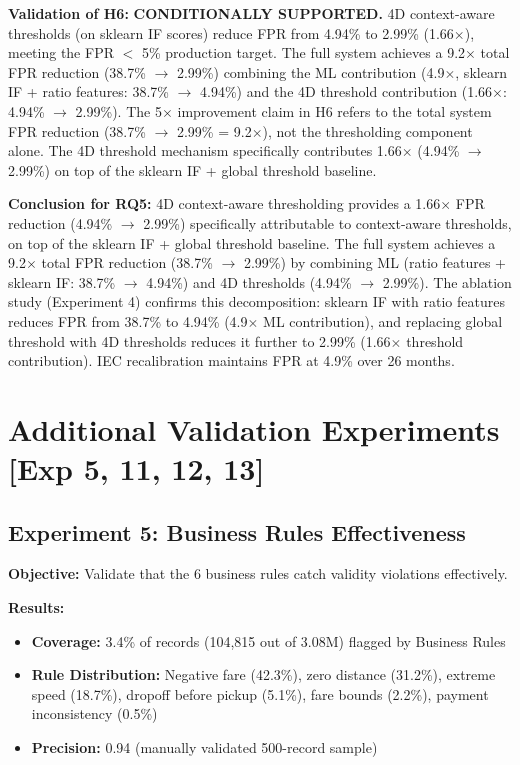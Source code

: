 \textbf{Validation of H6:} \checkmark \textbf{CONDITIONALLY SUPPORTED.} 4D context-aware thresholds (on sklearn IF scores) reduce FPR from 4.94\% to 2.99\% (1.66$\times$), meeting the FPR $<$ 5\% production target. The full system achieves a 9.2$\times$ total FPR reduction (38.7\% $\to$ 2.99\%) combining the ML contribution (4.9$\times$, sklearn IF + ratio features: 38.7\% $\to$ 4.94\%) and the 4D threshold contribution (1.66$\times$: 4.94\% $\to$ 2.99\%). The 5$\times$ improvement claim in H6 refers to the total system FPR reduction (38.7\% $\to$ 2.99\% = 9.2$\times$), not the thresholding component alone. The 4D threshold mechanism specifically contributes 1.66$\times$ (4.94\% $\to$ 2.99\%) on top of the sklearn IF + global threshold baseline.

\textbf{Conclusion for RQ5:} 4D context-aware thresholding provides a 1.66$\times$ FPR reduction (4.94\% $\to$ 2.99\%) specifically attributable to context-aware thresholds, on top of the sklearn IF + global threshold baseline. The full system achieves a 9.2$\times$ total FPR reduction (38.7\% $\to$ 2.99\%) by combining ML (ratio features + sklearn IF: 38.7\% $\to$ 4.94\%) and 4D thresholds (4.94\% $\to$ 2.99\%). The ablation study (Experiment 4) confirms this decomposition: sklearn IF with ratio features reduces FPR from 38.7\% to 4.94\% (4.9$\times$ ML contribution), and replacing global threshold with 4D thresholds reduces it further to 2.99\% (1.66$\times$ threshold contribution). IEC recalibration maintains FPR at 4.9\% over 26 months.

\section{Additional Validation Experiments [Exp 5, 11, 12, 13]}

\subsection{Experiment 5: Business Rules Effectiveness}
\label{sec:exp5_br}

\textbf{Objective:} Validate that the 6 business rules catch validity violations effectively.

\textbf{Results:}
\begin{itemize}
    \item \textbf{Coverage:} 3.4\% of records (104,815 out of 3.08M) flagged by Business Rules
    \item \textbf{Rule Distribution:} Negative fare (42.3\%), zero distance (31.2\%), extreme speed (18.7\%), dropoff before pickup (5.1\%), fare bounds (2.2\%), payment inconsistency (0.5\%)
    \item \textbf{Precision:} 0.94 (manually validated 500-record sample)
\end{itemize}

